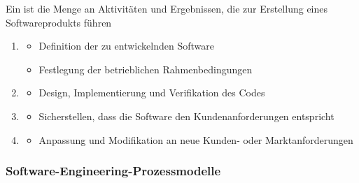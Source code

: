     Ein  ist die Menge an Aktivitäten und Ergebnissen, die zur Erstellung eines Softwareprodukts führen\\
    \begin{enumerate}
        \item {}
        \begin{itemize}
            \item Definition der zu entwickelnden Software
            \item Festlegung der betrieblichen Rahmenbedingungen
        \end{itemize}
        \item {}
        \begin{itemize}
            \item Design, Implementierung und Verifikation des Codes
        \end{itemize}
        \item {}
        \begin{itemize}
            \item Sicherstellen, dass die Software den Kundenanforderungen entspricht
        \end{itemize}
        \item {}
        \begin{itemize}
            \item Anpassung und Modifikation an neue Kunden- oder Marktanforderungen
        \end{itemize}
    \end{enumerate}

\subsubsection*{Software-Engineering-Prozessmodelle}


